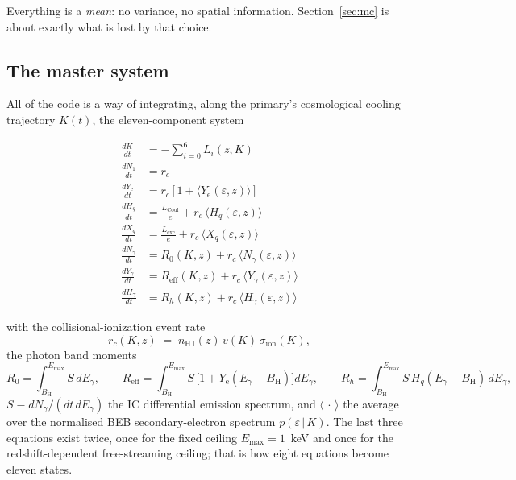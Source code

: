\documentclass[11pt,a4paper]{article}
\newcommand{\eps}{\varepsilon}
\newcommand{\Eg}{E_\gamma}
\newcommand{\BH}{B_{\mathrm{H}}}
\newcommand{\nHI}{n_{\mathrm{H\,I}}}
\newcommand{\sion}{\sigma_{\mathrm{ion}}}
\begin{document}
Everything is a \emph{mean}: no variance, no spatial information.  Section~\ref{sec:mc}
is about exactly what is lost by that choice.

\subsection{The master system}

All of the code is a way of integrating, along the primary's cosmological
cooling trajectory $K(t)$, the eleven-component system

\begin{align}
\frac{dK}{dt}      &= -\sum_{i=0}^{6} L_i(z,K)                                                        \label{eq:dK}\\[2pt]
\frac{dN_1}{dt}    &= r_c                                                                             \label{eq:dN1}\\[2pt]
\frac{dY_{\mathrm e}}{dt} &= r_c\,\bigl[\,1 + \langle Y_{\mathrm e}(\eps,z)\rangle\,\bigr]            \label{eq:dY}\\[2pt]
\frac{dH_q}{dt}    &= \frac{L_{\mathrm{Coul}}}{e} + r_c\,\langle H_q(\eps,z)\rangle                   \label{eq:dH}\\[2pt]
\frac{dX_q}{dt}    &= \frac{L_{\mathrm{exc}}}{e} + r_c\,\langle X_q(\eps,z)\rangle                    \label{eq:dX}\\[2pt]
\frac{dN_\gamma}{dt} &= R_0(K,z) + r_c\,\langle N_\gamma(\eps,z)\rangle                               \label{eq:dNg}\\[2pt]
\frac{dY_\gamma}{dt} &= R_{\mathrm{eff}}(K,z) + r_c\,\langle Y_\gamma(\eps,z)\rangle                  \label{eq:dYg}\\[2pt]
\frac{dH_\gamma}{dt} &= R_h(K,z) + r_c\,\langle H_\gamma(\eps,z)\rangle                               \label{eq:dHg}
\end{align}

with the collisional-ionization event rate
\begin{equation}
  r_c(K,z) \;=\; \nHI(z)\, v(K)\, \sion(K),
  \label{eq:rc}
\end{equation}
the photon band moments
\begin{equation}
  R_0 = \!\!\int_{\BH}^{E_{\max}}\!\!\! S\,d\Eg, \qquad
  R_{\mathrm{eff}} = \!\!\int_{\BH}^{E_{\max}}\!\!\! S\,\bigl[1+Y_{\mathrm e}(\Eg-\BH)\bigr] d\Eg, \qquad
  R_h = \!\!\int_{\BH}^{E_{\max}}\!\!\! S\,H_q(\Eg-\BH)\, d\Eg,
  \label{eq:moments}
\end{equation}
$S \equiv dN_\gamma/(dt\,d\Eg)$ the IC differential emission spectrum, and
$\langle\,\cdot\,\rangle$ the average over the normalised BEB secondary-electron
spectrum $p(\eps\,|\,K)$.  The last three equations exist twice, once for the
fixed ceiling $E_{\max}=1$~keV and once for the redshift-dependent
free-streaming ceiling; that is how eight equations become eleven states.
\end{document}
